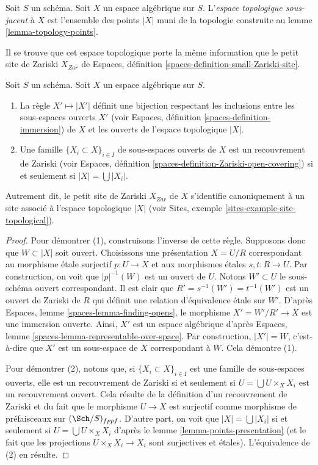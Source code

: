 \begin{definition}
\label{definition-topological-space}
Soit $S$ un schéma. Soit $X$ un espace algébrique sur $S$.
L'{\it espace topologique sous-jacent} à $X$ est l'ensemble des points
$|X|$ muni de la topologie construite au
lemme \ref{lemma-topology-points}.
\end{definition}

\noindent
Il se trouve que cet espace topologique porte la même information
que le petit site de Zariski $X_{Zar}$ de
Espaces, définition \ref{spaces-definition-small-Zariski-site}.

\begin{lemma}
\label{lemma-open-subspaces}
Soit $S$ un schéma.
Soit $X$ un espace algébrique sur $S$.
\begin{enumerate}
\item La règle $X' \mapsto |X'|$ définit une bijection respectant les inclusions
entre les sous-espaces ouverts $X'$ (voir
Espaces, définition \ref{spaces-definition-immersion})
de $X$ et les ouverts de l'espace topologique $|X|$.
\item Une famille $\{X_i \subset X\}_{i \in I}$ de sous-espaces ouverts de $X$
est un recouvrement de Zariski (voir
Espaces, définition \ref{spaces-definition-Zariski-open-covering})
si et seulement si $|X| = \bigcup |X_i|$.
\end{enumerate}
Autrement dit, le petit site de Zariski $X_{Zar}$ de $X$ s'identifie canoniquement
à un site associé à l'espace topologique $|X|$ (voir
Sites, exemple \ref{sites-example-site-topological}).
\end{lemma}

\begin{proof}
Pour démontrer (1), construisons l'inverse de cette règle.
Supposons donc que $W \subset |X|$ soit ouvert. Choisissons une présentation
$X = U/R$ correspondant au morphisme étale surjectif
$p : U \to X$ et aux morphismes étales $s, t : R \to U$.
Par construction, on voit que $|p|^{-1}(W)$ est un
ouvert de $U$. Notons $W' \subset U$ le sous-schéma ouvert correspondant.
Il est clair que $R' = s^{-1}(W') = t^{-1}(W')$ est un ouvert de Zariski
de $R$ qui définit une relation d'équivalence étale sur $W'$.
D'après Espaces, lemme \ref{spaces-lemma-finding-opens}, le morphisme
$X' = W'/R' \to X$ est une immersion ouverte. Ainsi, $X'$ est un espace algébrique
d'après Espaces, lemme \ref{spaces-lemma-representable-over-space}.
Par construction, $|X'| = W$, c'est-à-dire que $X'$ est un sous-espace de $X$
correspondant à $W$. Cela démontre (1).

\medskip\noindent
Pour démontrer (2), notons que, si $\{X_i \subset X\}_{i \in I}$ est une famille
de sous-espaces ouverts, elle est un recouvrement de Zariski si et seulement si
$U = \bigcup U \times_X X_i$ est un recouvrement ouvert. Cela résulte de
la définition d'un recouvrement de Zariski et du fait que le morphisme
$U \to X$ est surjectif comme morphisme de préfaisceaux sur $(\Sch/S)_{fppf}$.
D'autre part, on voit que $|X| = \bigcup |X_i|$ si et seulement si
$U = \bigcup U \times_X X_i$ d'après le lemme \ref{lemma-points-presentation}
(et le fait que les projections $U \times_X X_i \to X_i$ sont surjectives
et étales). L'équivalence de (2) en résulte.
\end{proof}

